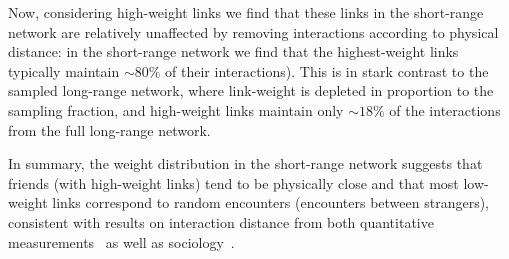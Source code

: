\documentclass[fleqn,10pt]{wlscirep}
\begin{document}
Now, considering high-weight links we find that these links in the short-range network are relatively unaffected by removing interactions according to physical distance: in the short-range network we find that the highest-weight links typically maintain $\sim 80\%$ of their interactions).
This is in stark contrast to the sampled long-range network, where link-weight is depleted in proportion to the sampling fraction, and high-weight links maintain only $\sim 18\%$ of the interactions from the full long-range network.

In summary, the weight distribution in the short-range network suggests that friends (with high-weight links) tend to be physically close and that most low-weight links correspond to random encounters (encounters between strangers), consistent with results on interaction distance from both quantitative measurements~\cite{sekara2014strength} as well as sociology~\cite{hall1969hidden}.
\end{document}

